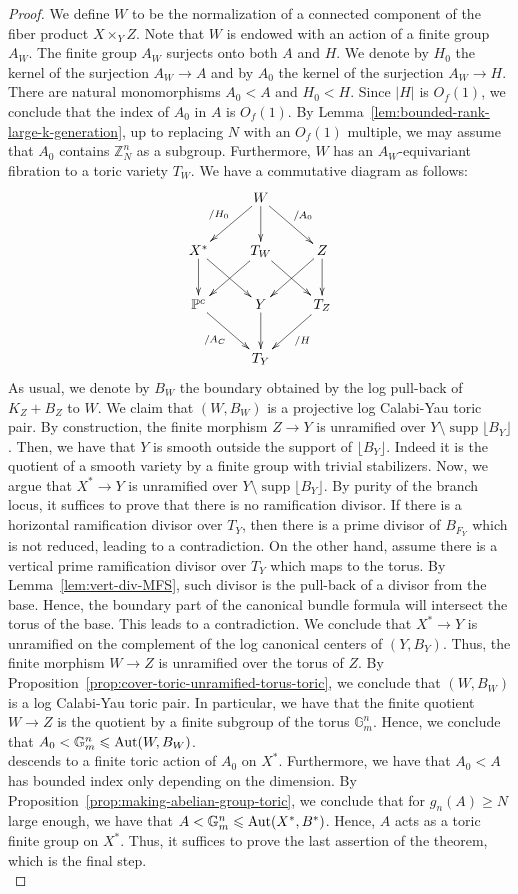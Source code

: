 \documentclass{amsart}
\newcommand{\supp}{\operatorname{supp}}
\newcommand{\pp}{\mathbb{P}}
\newcommand{\zz}{\mathbb{Z}}
\theoremstyle{remark}
\numberwithin{equation}{section}
\begin{document}
\begin{proof}
We define $W$ to be the normalization of a connected component of the fiber product $X\times_Y Z$.
Note that $W$ is endowed with an action of a finite group $A_W$.
The finite group $A_W$ surjects onto both $A$ and $H$.
We denote by $H_0$ the kernel of the surjection $A_W\rightarrow A$
and by $A_0$ the kernel of the surjection $A_W\rightarrow H$.
There are natural monomorphisms
$A_0<A$ and $H_0<H$.
Since $|H|$ is $O_f(1)$, we conclude that the index of $A_0$ in $A$ is $O_f(1)$.
By Lemma~\ref{lem:bounded-rank-large-k-generation}, 
up to replacing $N$ with an $O_f(1)$ multiple, 
we may assume that $A_0$ contains $\zz^n_N$ as a subgroup.
Furthermore, $W$ has an $A_W$-equivariant fibration to a toric variety $T_W$.
We have a commutative diagram as follows:
\[
\xymatrix{
& W\ar[ld]_-{/H_0}\ar[rd]^-{/A_0}\ar[d] & \\
X^*\ar[d]\ar[rd] & T_W\ar[ld]\ar[rd] & Z\ar[d]\ar[ld] \\
 \pp^c\ar[rd]_-{/A_C} & Y\ar[d] & T_Z\ar[ld]^-{/H} \\
 &  T_Y
}
\]
As usual, we denote by $B_W$ the boundary obtained by the log pull-back
of $K_Z+B_Z$ to $W$.
We claim that $(W,B_W)$ is a projective log Calabi-Yau toric pair.
By construction, the finite morphism
$Z\rightarrow Y$ is unramified over $Y\setminus \supp \lfloor B_Y\rfloor$.
Then, we have that $Y$ is smooth outside the support
of $\lfloor B_Y \rfloor$.
Indeed it is the quotient of a smooth variety by a finite group with trivial stabilizers.
Now, we argue that $X^*\rightarrow Y$ is unramified over
$Y\setminus \supp \lfloor B_Y\rfloor$.
By purity of the branch locus, it suffices to prove that there is no ramification divisor.
If there is a horizontal ramification divisor over $T_Y$, 
then there is a prime divisor of $B_{F_Y}$ which is not reduced, leading to a contradiction.
On the other hand, assume there is a vertical prime ramification divisor over $T_Y$ which maps to the torus.
By Lemma~\ref{lem:vert-div-MFS},
such divisor is the pull-back of a divisor from the base.
Hence, the boundary part of the canonical bundle formula
will intersect the torus of the base.
This leads to a contradiction.
We conclude that $X^*\rightarrow Y$ is unramified on the complement of the log canonical centers of $(Y,B_Y)$.
Thus, the finite morphism $W\rightarrow Z$ is unramified over the torus of $Z$.
By Proposition~\ref{prop:cover-toric-unramified-torus-toric}, we conclude that $(W,B_W)$ is a log Calabi-Yau toric pair.
In particular, we have that the finite quotient $W\rightarrow Z$
is the quotient by a finite subgroup of the torus $\mathbb{G}_m^n$.
Hence, we conclude that $A_0 < \mathbb{G}_m^n \leqslant {\rm Aut}(W,B_W)$.\\ 
descends to a finite toric action of $A_0$ on $X^*$.
Furthermore, we have that $A_0<A$ has bounded index only depending on the dimension.
By Proposition~\ref{prop:making-abelian-group-toric}, we conclude that for $g_n(A)\geq N$ large enough, we have that
$A<\mathbb{G}_m^n\leqslant {\rm Aut}(X^*,B^*)$.
Hence, $A$ acts as a toric finite group on $X^*$.
Thus, it suffices to prove the last assertion of the theorem, which is the final step.\\


\end{proof}
\end{document}
